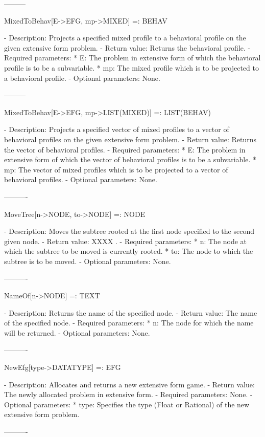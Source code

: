 ---------

MixedToBehav[E->EFG, mp->MIXED] =: BEHAV

   -	Description:  Projects a specified mixed profile to a behavioral 
	profile on the given extensive form problem.
   -	Return value:  Returns the behavioral profile.
   -	Required parameters:
	  *  E:  The problem in extensive form of which the behavioral profile
		is to be a subvariable.
	  *  mp:  The mixed profile which is to be projected to a behavioral
		profile.
   -	Optional parameters:  None.

---------

MixedToBehav[E->EFG, mp->LIST(MIXED)] =: LIST(BEHAV)

   -	Description:  Projects a specified vector of mixed profiles to a vector
	of behavioral profiles on the given extensive form problem.
   -	Return value:  Returns the vector of behavioral profiles.
   -	Required parameters:
	  *  E:  The problem in extensive form of which the vector of 
		behavioral profiles is to be a subvariable.
	  *  mp:  The vector of mixed profiles which is to be projected to a 
		vector of behavioral profiles.
   -	Optional parameters:  None.

----------

MoveTree[n->NODE, to->NODE] =: NODE

   -	Description:  Moves the subtree rooted at the first node specified to
	the second given node.
   -	Return value:  XXXX .
   -	Required parameters:
	  *  n:  The node at which the subtree to be moved is currently rooted.
	  *  to:  The node to which the subtree is to be moved.
   -	Optional parameters:  None.

----------

NameOf[n->NODE] =: TEXT

   -	Description:  Returns the name of the specified node.
   -	Return value:  The name of the specified node.
   -	Required parameters:
	   *  n:  The node for which the name will be returned.
   -	Optional parameters:  None.

----------

NewEfg[{type->DATATYPE}] =: EFG

   -	Description:  Allocates and returns a new extensive form game.
   -	Return value:  The newly allocated problem in extensive form.
   -	Required parameters:  None.
   -	Optional parameters: 
	  *  type:  Specifies the type (Float or Rational) of the new extensive
		form problem.

----------

